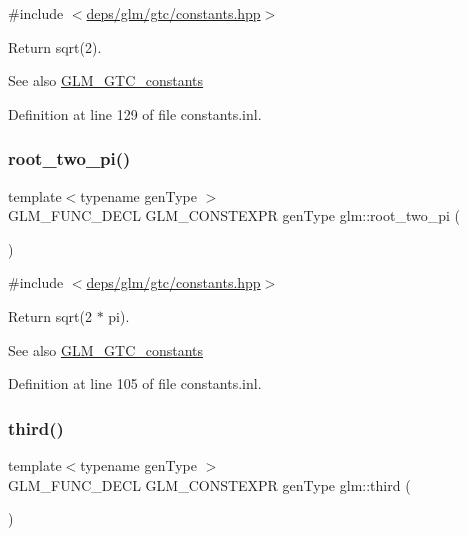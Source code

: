 {\ttfamily \#include $<$\hyperlink{constants_8hpp}{deps/glm/gtc/constants.\+hpp}$>$}

Return sqrt(2). \begin{DoxySeeAlso}{See also}
\hyperlink{group__gtc__constants}{G\+L\+M\+\_\+\+G\+T\+C\+\_\+constants} 
\end{DoxySeeAlso}


Definition at line 129 of file constants.\+inl.

\mbox{\label{group__gtc__constants_ga2bcedc575039fe0cd765742f8bbb0bd3}} 
\subsubsection{\texorpdfstring{root\+\_\+two\+\_\+pi()}{root\_two\_pi()}}
{\footnotesize\ttfamily template$<$typename gen\+Type $>$ \\
G\+L\+M\+\_\+\+F\+U\+N\+C\+\_\+\+D\+E\+CL G\+L\+M\+\_\+\+C\+O\+N\+S\+T\+E\+X\+PR gen\+Type glm\+::root\+\_\+two\+\_\+pi (\begin{DoxyParamCaption}{ }\end{DoxyParamCaption})}



{\ttfamily \#include $<$\hyperlink{constants_8hpp}{deps/glm/gtc/constants.\+hpp}$>$}

Return sqrt(2 $\ast$ pi). \begin{DoxySeeAlso}{See also}
\hyperlink{group__gtc__constants}{G\+L\+M\+\_\+\+G\+T\+C\+\_\+constants} 
\end{DoxySeeAlso}


Definition at line 105 of file constants.\+inl.

\mbox{\label{group__gtc__constants_ga3077c6311010a214b69ddc8214ec13b5}} 
\subsubsection{\texorpdfstring{third()}{third()}}
{\footnotesize\ttfamily template$<$typename gen\+Type $>$ \\
G\+L\+M\+\_\+\+F\+U\+N\+C\+\_\+\+D\+E\+CL G\+L\+M\+\_\+\+C\+O\+N\+S\+T\+E\+X\+PR gen\+Type glm\+::third (\begin{DoxyParamCaption}{ }\end{DoxyParamCaption})}



